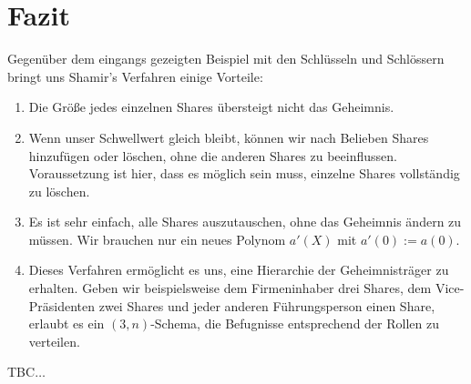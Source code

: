 \documentclass[12pt, a4paper, oneside, titlepage]{report}
\theoremstyle{definition}
\begin{document}
	\section{Fazit}
	Gegenüber dem eingangs gezeigten Beispiel mit den Schlüsseln und Schlössern bringt uns Shamir's Verfahren einige Vorteile:
	
	\begin{enumerate}
		\item {
			Die Größe jedes einzelnen Shares übersteigt nicht das Geheimnis.
		}
		\item {
			Wenn unser Schwellwert gleich bleibt, können wir nach Belieben Shares hinzufügen oder löschen, ohne die anderen Shares zu beeinflussen. Voraussetzung ist hier, dass es möglich sein muss, einzelne Shares vollständig zu löschen.
		}
		\item {
			Es ist sehr einfach, alle Shares auszutauschen, ohne das Geheimnis ändern zu müssen. Wir brauchen nur ein neues Polynom $ a'(X) $ mit $ a'(0) := a(0) $.
		}
		\item {
			Dieses Verfahren ermöglicht es uns, eine Hierarchie der Geheimnisträger zu erhalten. Geben wir beispielsweise dem Firmeninhaber drei Shares, dem Vice-Präsidenten zwei Shares und jeder anderen Führungsperson einen Share, erlaubt es ein $ (3, n) $-Schema, die Befugnisse entsprechend der Rollen zu verteilen. \cite{shamir}
		}
	\end{enumerate}
	TBC$\dots$ %
	\cleardoublepage
	\begingroup
	\let\clearpage\relax
	
	\endgroup
\end{document}
